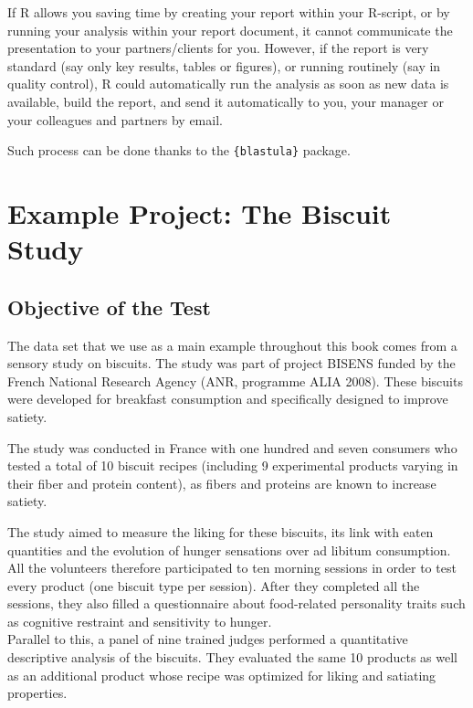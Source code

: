 \documentclass[
]{krantz}
\begin{document}
If R allows you saving time by creating your report within your R-script, or by running your analysis within your report document, it cannot communicate the presentation to your partners/clients for you. However, if the report is very standard (say only key results, tables or figures), or running routinely (say in quality control), R could automatically run the analysis as soon as new data is available, build the report, and send it automatically to you, your manager or your colleagues and partners by email.

Such process can be done thanks to the \texttt{\{blastula\}} package.

\hypertarget{example-projects}{%
\chapter{Example Project: The Biscuit Study}\label{example-projects}}

\hypertarget{objective-of-the-test}{%
\section{Objective of the Test}\label{objective-of-the-test}}

The data set that we use as a main example throughout this book comes from a sensory study on biscuits. The study was part of project BISENS funded by the French National Research Agency (ANR, programme ALIA 2008). These biscuits were developed for breakfast consumption and specifically designed to improve satiety.

The study was conducted in France with one hundred and seven consumers who tested a total of 10 biscuit recipes (including 9 experimental products varying in their fiber and protein content), as fibers and proteins are known to increase satiety.

The study aimed to measure the liking for these biscuits, its link with eaten quantities and the evolution of hunger sensations over ad libitum consumption. All the volunteers therefore participated to ten morning sessions in order to test every product (one biscuit type per session). After they completed all the sessions, they also filled a questionnaire about food-related personality traits such as cognitive restraint and sensitivity to hunger.\\
Parallel to this, a panel of nine trained judges performed a quantitative descriptive analysis of the biscuits. They evaluated the same 10 products as well as an additional product whose recipe was optimized for liking and satiating properties.
\end{document}
